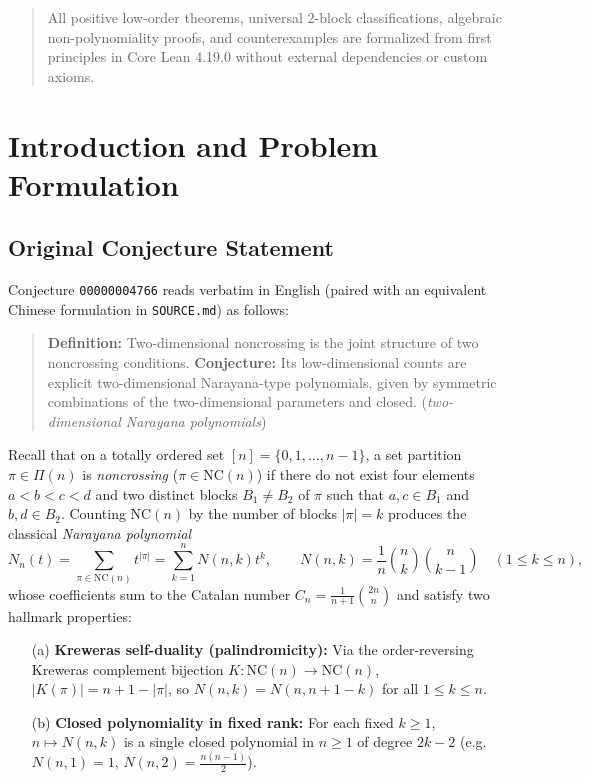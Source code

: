 \documentclass[11pt]{article}
\theoremstyle{plain}
\theoremstyle{definition}
\newcommand{\NC}{\mathrm{NC}}
\begin{document}
\begin{abstract}
\begin{itemize}
\end{itemize}
All positive low-order theorems, universal $2$-block classifications, algebraic non-polynomiality proofs, and counterexamples are formalized from first principles in Core Lean 4.19.0 without external dependencies or custom axioms.
\end{abstract}

\section{Introduction and Problem Formulation}

\subsection{Original Conjecture Statement}
Conjecture \texttt{00000004766} reads verbatim in English (paired with an equivalent Chinese formulation in \texttt{SOURCE.md}) as follows:
\begin{quote}\sloppy
\textbf{Definition:} Two-dimensional noncrossing is the joint structure of two noncrossing conditions. \textbf{Conjecture:} Its low-dimensional counts are explicit two-dimensional Narayana-type polynomials, given by symmetric combinations of the two-dimensional parameters and closed. (\emph{two-dimensional Narayana polynomials})
\end{quote}

Recall that on a totally ordered set $[n] = \{0, 1, \dots, n-1\}$, a set partition $\pi \in \Pi(n)$ is \emph{noncrossing} ($\pi \in \NC(n)$) if there do not exist four elements $a < b < c < d$ and two distinct blocks $B_1 \ne B_2$ of $\pi$ such that $a, c \in B_1$ and $b, d \in B_2$. Counting $\NC(n)$ by the number of blocks $|\pi| = k$ produces the classical \emph{Narayana polynomial}
\begin{equation}\label{eq:narayana-1d}
  N_n(t) = \sum_{\pi \in \NC(n)} t^{|\pi|} = \sum_{k=1}^{n} N(n, k) t^k, \qquad
  N(n, k) = \frac{1}{n}\binom{n}{k}\binom{n}{k-1} \quad (1 \le k \le n),
\end{equation}
whose coefficients sum to the Catalan number $C_n = \frac{1}{n+1}\binom{2n}{n}$ and satisfy two hallmark properties:
\begin{itemize}\setlength{\itemsep}{2pt}
  \item[(a)] \textbf{Kreweras self-duality (palindromicity):} Via the order-reversing Kreweras complement bijection $K : \NC(n) \to \NC(n)$, $|K(\pi)| = n + 1 - |\pi|$, so $N(n, k) = N(n, n + 1 - k)$ for all $1 \le k \le n$.
  \item[(b)] \textbf{Closed polynomiality in fixed rank:} For each fixed $k \ge 1$, $n \mapsto N(n, k)$ is a single closed polynomial in $n \ge 1$ of degree $2k - 2$ (e.g.\ $N(n, 1) = 1$, $N(n, 2) = \frac{n(n-1)}{2}$).
\end{itemize}
\end{document}
